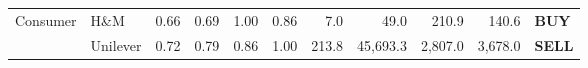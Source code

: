 {\begin{table}
\begin{tabular}{llrrrrrrrrl}
            \cline{1-11}
            \multirow[c]{2}{*}{Consumer} & H\&M     & {\cellcolor[HTML]{EB6628}} \color[HTML]{F1F1F1} 0.66 & {\cellcolor[HTML]{F1731D}} \color[HTML]{F1F1F1} 0.69 & {\cellcolor[HTML]{FCFFA4}} \color[HTML]{000000} 1.00 & {\cellcolor[HTML]{FAC42A}} \color[HTML]{000000} 0.86 & 7.0                     & 49.0                     & 210.9                    & 140.6                   & \color[HTML]{33FF85} \bfseries BUY  \\
                                         & Unilever & {\cellcolor[HTML]{F68013}} \color[HTML]{F1F1F1} 0.72 & {\cellcolor[HTML]{FCA108}} \color[HTML]{000000} 0.79 & {\cellcolor[HTML]{FAC42A}} \color[HTML]{000000} 0.86 & {\cellcolor[HTML]{FCFFA4}} \color[HTML]{000000} 1.00 & 213.8                   & 45,693.3                 & 2,807.0                  & 3,678.0                 & \color[HTML]{FF5933} \bfseries SELL \\
            \cline{1-11}
            \bottomrule
        \end{tabular}
    \end{table}
}
